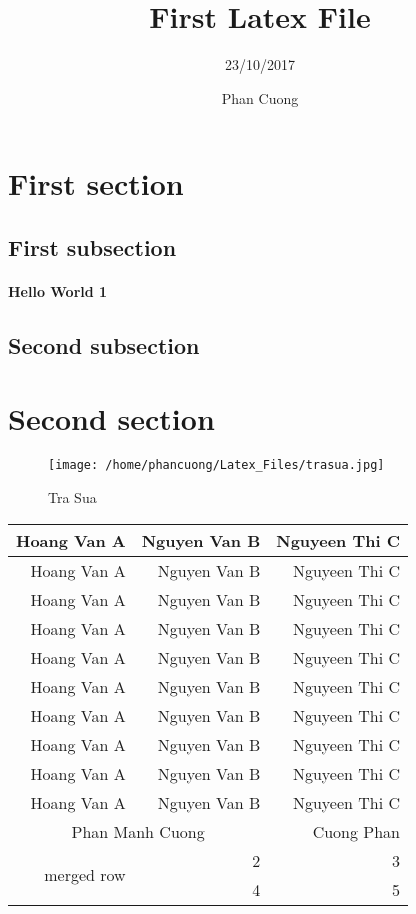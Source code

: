 \documentclass[a4paper,12pt]{article}
\begin{document}
\title{First Latex File}
\author{23/10/2017}
\date{Phan Cuong}
\maketitle
\section{First section}
\subsection{First subsection}
\paragraph{Hello World 1}
\subsection{Second subsection}
\section{Second section}
\begin{figure}[h]
\centering
\texttt{[image: /home/phancuong/Latex\_Files/trasua.jpg]}
\caption{Tra Sua}
\label{}
\end{figure}
\begin{longtable}{|r|r|r|}
\hline
Hoang Van A&Nguyen Van B&Nguyeen Thi C\\
\hline
Hoang Van A&Nguyen Van B&Nguyeen Thi C\\
\hline
Hoang Van A&Nguyen Van B&Nguyeen Thi C\\
\hline
Hoang Van A&Nguyen Van B&Nguyeen Thi C\\
\hline
Hoang Van A&Nguyen Van B&Nguyeen Thi C\\
\hline
Hoang Van A&Nguyen Van B&Nguyeen Thi C\\
\hline
Hoang Van A&Nguyen Van B&Nguyeen Thi C\\
\hline
Hoang Van A&Nguyen Van B&Nguyeen Thi C\\
\hline
Hoang Van A&Nguyen Van B&Nguyeen Thi C\\
\hline
Hoang Van A&Nguyen Van B&Nguyeen Thi C\\
\hline
\multicolumn{2}{|c|}{Phan Manh Cuong}&Cuong Phan\\
\hline
\multirow{2}{*}{merged row}&2&3\\
\hhline{~--}
&4&5\\
\hline
\end{longtable}
\end{document}
